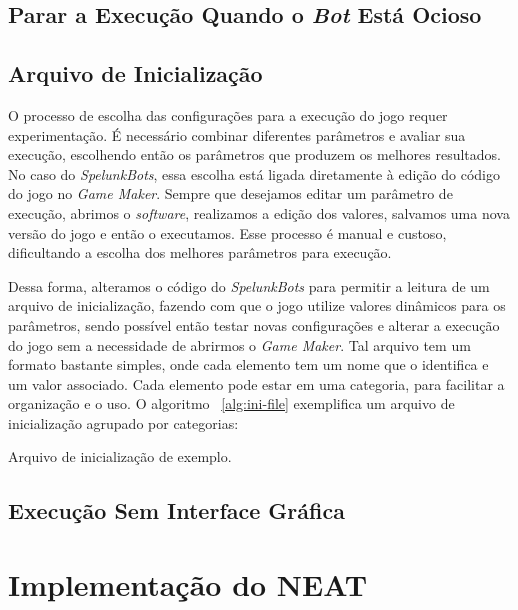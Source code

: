 \subsection{Parar a Execução Quando o \textit{Bot} Está Ocioso}

\subsection{Arquivo de Inicialização}

O processo de escolha das configurações para a execução do jogo requer
experimentação. É necessário combinar diferentes parâmetros e avaliar sua
execução, escolhendo então os parâmetros que produzem os melhores resultados.
No caso do \textit{SpelunkBots}, essa escolha está ligada diretamente à edição
do código do jogo no \textit{Game Maker}. Sempre que desejamos editar um
parâmetro de execução, abrimos o \textit{software}, realizamos a edição dos
valores, salvamos uma nova versão do jogo e então o executamos. Esse processo é
manual e custoso, dificultando a escolha dos melhores parâmetros para execução.  

Dessa forma, alteramos o código do \textit{SpelunkBots} para permitir a leitura
de um arquivo de inicialização, fazendo com que o jogo utilize valores dinâmicos para os
parâmetros, sendo possível então testar novas configurações e alterar a
execução do jogo sem a necessidade de abrirmos o \textit{Game Maker}. Tal
arquivo tem um formato bastante simples, onde cada elemento tem um nome que o
identifica e um valor associado. Cada elemento pode estar em uma categoria,
para facilitar a organização e o uso. O algoritmo ~\ref{alg:ini-file}
exemplifica um arquivo de inicialização agrupado por categorias:

\begin{algorithm}[H]

\caption[Arquivo de inicialização de exemplo.]
{\label{alg:ini-file}Arquivo de inicialização de exemplo.}
\end{algorithm}

\subsection{Execução Sem Interface Gráfica}

\section{\label{section:neat-details}Implementação do NEAT}

